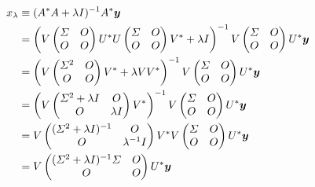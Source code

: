 \begin{align}
    x_{\lambda}
     & \equiv (A^* A + \lambda I)^{-1} A^* \bm{y}
    \notag                                        \\
     & = \left(V
    \begin{pmatrix}
        \varSigma & O \\
        O      & O
    \end{pmatrix}
    U^* U
    \begin{pmatrix}
        \varSigma & O \\
        O      & O
    \end{pmatrix}
    V^* + \lambda I \right)^{-1}
    V
    \begin{pmatrix}
        \varSigma & O \\
        O      & O
    \end{pmatrix}
    U^* \bm{y}
    \notag                                        \\
     & = \left(V
    \begin{pmatrix}
        \varSigma^2 & O \\
        O        & O
    \end{pmatrix}
    V^* + \lambda V V^* \right)^{-1}
    V
    \begin{pmatrix}
        \varSigma & O \\
        O      & O
    \end{pmatrix}
    U^* \bm{y}
    \notag                                        \\
     & = \left(V
    \begin{pmatrix}
        \varSigma^2 + \lambda I & O         \\
        O                    & \lambda I
    \end{pmatrix}
    V^* \right)^{-1}
    V
    \begin{pmatrix}
        \varSigma & O \\
        O      & O
    \end{pmatrix}
    U^* \bm{y}
    \notag                                        \\
     & = V
    \begin{pmatrix}
        (\varSigma^2 + \lambda I)^{-1} & O              \\
        O                           & \lambda^{-1} I
    \end{pmatrix}
    V^*
    V
    \begin{pmatrix}
        \varSigma & O \\
        O      & O
    \end{pmatrix}
    U^* \bm{y}
    \notag                                        \\
     & = V
    \begin{pmatrix}
        (\varSigma^2 + \lambda I)^{-1} \varSigma & O \\
        O                                  & O
    \end{pmatrix}
    U^* \bm{y}
\end{align}

